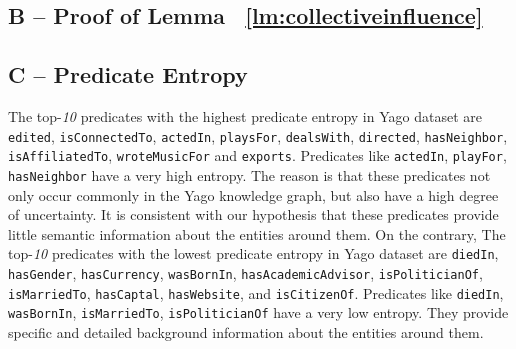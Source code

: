 \vspace{-0.8\baselineskip}
\subsection{B -- Proof of Lemma ~\ref{lm:collectiveinfluence}}



\vspace{-0.8\baselineskip}
\subsection{C -- Predicate Entropy}

The top-{\em 10} predicates with the highest predicate entropy in Yago dataset are {\tt edited}, {\tt isConnectedTo}, {\tt actedIn}, {\tt playsFor}, {\tt dealsWith}, {\tt directed}, {\tt hasNeighbor}, {\tt isAffiliatedTo}, {\tt wroteMusicFor} and {\tt exports}. Predicates like {\tt actedIn}, {\tt playFor}, {\tt hasNeighbor} have a very high entropy. 
The reason is that these predicates not only occur commonly in the Yago knowledge graph, but also 
have a high degree of uncertainty.
It is consistent with our hypothesis that these predicates provide little semantic information about the entities around them.
On the contrary, The top-{\em 10} predicates with the lowest predicate entropy in Yago dataset are {\tt diedIn}, {\tt hasGender}, {\tt hasCurrency}, {\tt wasBornIn}, {\tt hasAcademicAdvisor},  {\tt isPoliticianOf}, {\tt isMarriedTo}, {\tt hasCaptal}, {\tt hasWebsite}, and {\tt isCitizenOf}. Predicates like {\tt diedIn}, {\tt wasBornIn}, {\tt isMarriedTo}, {\tt isPoliticianOf} have a very low entropy.
They provide specific and detailed background information about the entities around them.


